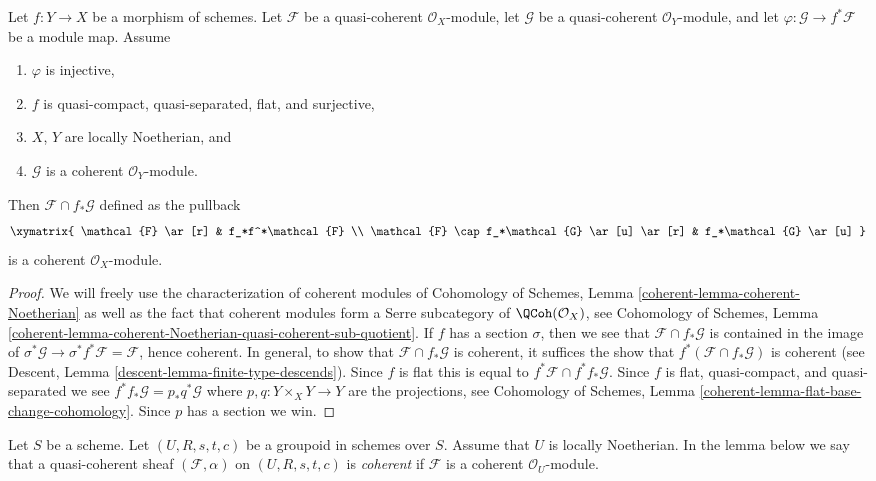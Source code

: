 \begin{lemma}
\label{lemma-push-pull}
Let $f : Y \to X$ be a morphism of schemes. Let $\mathcal{F}$
be a quasi-coherent $\mathcal{O}_X$-module, let $\mathcal{G}$
be a quasi-coherent $\mathcal{O}_Y$-module, and let
$\varphi : \mathcal{G} \to f^*\mathcal{F}$ be a module map. Assume
\begin{enumerate}
\item $\varphi$ is injective,
\item $f$ is quasi-compact, quasi-separated, flat, and surjective,
\item $X$, $Y$ are locally Noetherian, and
\item $\mathcal{G}$ is a coherent $\mathcal{O}_Y$-module.
\end{enumerate}
Then $\mathcal{F} \cap f_*\mathcal{G}$ defined as the pullback
$$
\xymatrix{
\mathcal{F} \ar[r] & f_*f^*\mathcal{F} \\
\mathcal{F} \cap f_*\mathcal{G} \ar[u] \ar[r] &
f_*\mathcal{G} \ar[u]
}
$$
is a coherent $\mathcal{O}_X$-module.
\end{lemma}

\begin{proof}
We will freely use the characterization of coherent modules of
Cohomology of Schemes, Lemma \ref{coherent-lemma-coherent-Noetherian}
as well as the fact that coherent modules form a Serre subcategory
of $\QCoh(\mathcal{O}_X)$, see
Cohomology of Schemes,
Lemma \ref{coherent-lemma-coherent-Noetherian-quasi-coherent-sub-quotient}.
If $f$ has a section $\sigma$, then we see that
$\mathcal{F} \cap f_*\mathcal{G}$ is contained in the image of
$\sigma^*\mathcal{G} \to \sigma^*f^*\mathcal{F} = \mathcal{F}$,
hence coherent. In general, to show that $\mathcal{F} \cap f_*\mathcal{G}$
is coherent, it suffices the show that
$f^*(\mathcal{F} \cap f_*\mathcal{G})$ is coherent (see
Descent, Lemma \ref{descent-lemma-finite-type-descends}).
Since $f$ is flat this is equal to $f^*\mathcal{F} \cap f^*f_*\mathcal{G}$.
Since $f$ is flat, quasi-compact, and quasi-separated we see
$f^*f_*\mathcal{G} = p_*q^*\mathcal{G}$ where $p, q : Y \times_X Y \to Y$
are the projections, see
Cohomology of Schemes, Lemma \ref{coherent-lemma-flat-base-change-cohomology}.
Since $p$ has a section we win.
\end{proof}

\noindent
Let $S$ be a scheme. Let $(U, R, s, t, c)$ be a groupoid in schemes over $S$.
Assume that $U$ is locally Noetherian. In the lemma below we say that a
quasi-coherent sheaf $(\mathcal{F}, \alpha)$ on $(U, R, s, t, c)$ is
{\it coherent} if $\mathcal{F}$ is a coherent $\mathcal{O}_U$-module.

